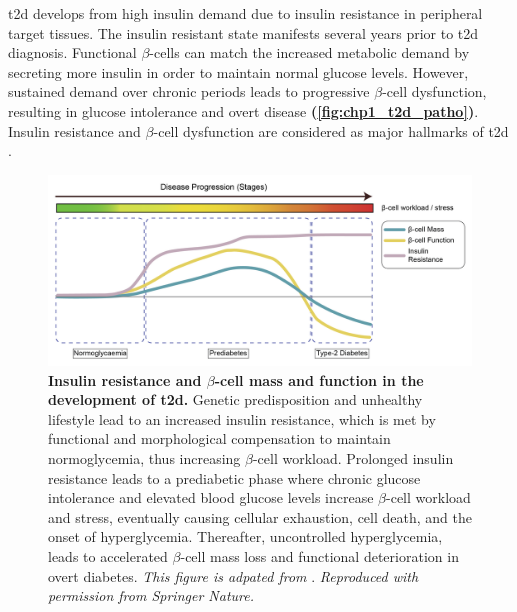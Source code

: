 \acrfull{t2d} develops from high insulin demand due to insulin resistance in peripheral target tissues. The insulin resistant state manifests several years prior to \gls{t2d} diagnosis. Functional $\beta$-cells can match the increased metabolic demand by secreting more insulin in order to maintain normal glucose levels. However, sustained demand over chronic periods leads to progressive $\beta$-cell dysfunction, resulting in glucose intolerance and overt disease \textbf{(\autoref{fig:chp1_t2d_patho})}. Insulin resistance and $\beta$-cell dysfunction are considered as major hallmarks of \gls{t2d} \textbf{\cite{banday_pathophysiology_2020}}.\\

\begin{figure}[H]
    \centering
    \includegraphics[width=\linewidth]{Chapter1/Fig/F1-3-04.png}
    \caption[Pathogenesis of ]{\textbf{Insulin resistance and $\beta$-cell mass and function in the development of \gls{t2d}.} Genetic predisposition and unhealthy lifestyle lead to an increased insulin resistance, which is met by functional and morphological compensation to maintain normoglycemia, thus increasing $\beta$-cell workload. Prolonged insulin resistance leads to a prediabetic phase where chronic glucose intolerance and elevated blood glucose levels increase $\beta$-cell workload and stress, eventually causing cellular exhaustion, cell death, and the onset of hyperglycemia. Thereafter, uncontrolled hyperglycemia, leads to accelerated $\beta$-cell mass loss and functional deterioration in overt diabetes. \textit{This figure is adpated from }\textbf{\cite{chen_human_2017}}.\textit{ Reproduced with permission from Springer Nature.}}
    \label{fig:chp1_t2d_patho}
\end{figure}

